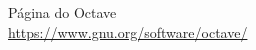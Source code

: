 \documentclass[a4paper,11pt]{article}
\begin{document}


\begin{thebibliography}{4}
	Página do Octave \\
	\url{https://www.gnu.org/software/octave/}
	
	
\end{thebibliography}
\end{document}
